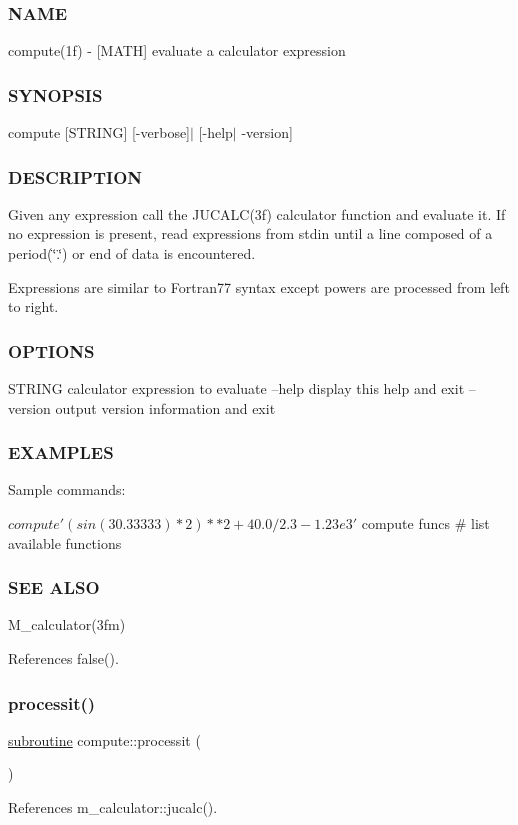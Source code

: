 \subsubsection*{N\+A\+ME}

compute(1f) -\/ \mbox{[}M\+A\+TH\mbox{]} evaluate a calculator expression \subsubsection*{S\+Y\+N\+O\+P\+S\+IS}

compute \mbox{[}S\+T\+R\+I\+NG\mbox{]} \mbox{[}-\/verbose\mbox{]}$\vert$ \mbox{[}-\/help$\vert$ -\/version\mbox{]} \subsubsection*{D\+E\+S\+C\+R\+I\+P\+T\+I\+ON}

Given any expression call the J\+U\+C\+A\+L\+C(3f) calculator function and evaluate it. If no expression is present, read expressions from stdin until a line composed of a period(\char`\"{}.\char`\"{}) or end of data is encountered.

Expressions are similar to Fortran77 syntax except powers are processed from left to right. \subsubsection*{O\+P\+T\+I\+O\+NS}

S\+T\+R\+I\+NG calculator expression to evaluate --help display this help and exit --version output version information and exit \subsubsection*{E\+X\+A\+M\+P\+L\+ES}

\begin{DoxyVerb}    Sample commands:

     $ compute '(sin(30.33333)*2)**2+40.0/2.3-1.23e3'

     $ compute funcs # list available functions
\end{DoxyVerb}


\subsubsection*{S\+EE A\+L\+SO}

M\+\_\+calculator(3fm) 

References false().

\mbox{\label{compute_8f90_a6b077f312d27a28f21803c6d624132b7}} 
\subsubsection{\texorpdfstring{processit()}{processit()}}
{\footnotesize\ttfamily \hyperlink{M__stopwatch_83_8txt_acfbcff50169d691ff02d4a123ed70482}{subroutine} compute\+::processit (\begin{DoxyParamCaption}{ }\end{DoxyParamCaption})}



References m\+\_\+calculator\+::jucalc().

